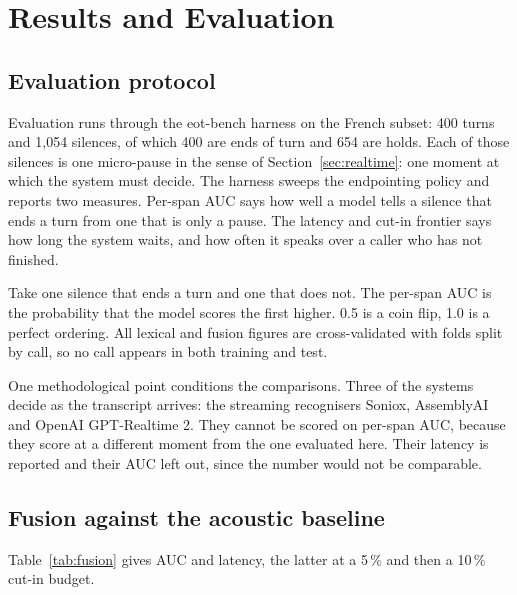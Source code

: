 \chapter{Results and Evaluation}
\label{ch:results}

\section{Evaluation protocol}
\label{sec:protocol}

Evaluation runs through the eot-bench harness on the French subset: 400 turns and
1{,}054 silences, of which 400 are ends of turn and 654 are holds. Each of those silences is one micro-pause in the sense of
Section~\ref{sec:realtime}: one moment at which the system must decide. The harness sweeps
the endpointing policy and reports two measures. Per-span AUC says how well a model tells a
silence that ends a turn from one that is only a pause. The latency and cut-in frontier says
how long the system waits, and how often it speaks over a caller who has not finished. 

Take one silence that ends a turn and one that
does not. The per-span AUC is the probability that the model scores the first higher. 0.5 is
a coin flip, 1.0 is a perfect ordering. All lexical and fusion figures are cross-validated with folds split by call,
so no call appears in both training and test.

One methodological point conditions the comparisons. Three of the systems decide as the transcript
arrives: the streaming recognisers Soniox, AssemblyAI and OpenAI GPT-Realtime 2. They cannot
be scored on per-span AUC, because they score at a different moment from the one evaluated
here. Their latency is reported and their AUC left out, since the number would not be
comparable. 

\section{Fusion against the acoustic baseline}
\label{sec:fusionresults}

Table~\ref{tab:fusion} gives AUC and latency, the latter at a 5\,\% and then a 10\,\%
cut-in budget.

